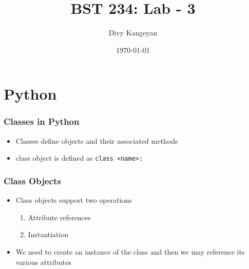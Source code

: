 \documentclass{beamer}
\title[BST 234]{BST 234: Lab - 3}
\author[Divy Kangeyan]{Divy Kangeyan}
\date{\today}
\begin{document}
	
	\begin{frame}
		\titlepage
	\end{frame}
	
	
\section{Python}

\begin{frame}
\frametitle{Classes in Python}

\begin{itemize}
\item Classes define objects and their associated methods
\item class object is defined as \texttt{class <name>:}

\end{itemize}




\end{frame}



\begin{frame}
\frametitle{Class Objects}

\begin{itemize}
\item Class objects support two operations
\begin{enumerate}
\item Attribute references
\item Instantiation
\end{enumerate}

\item We need to create an instance of the class and then we may reference its various attributes

\end{itemize}
\end{frame}
\end{document}
